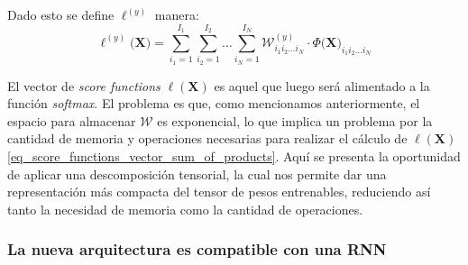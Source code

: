 \documentclass[spanish]{article}
\theoremstyle{definition}
\theoremstyle{remark}
\numberwithin{equation}{section}
\numberwithin{equation}{section} %
\begin{document}
Dado esto se define $\ell^{(y)}$ manera:
\begin{equation}
\label{eq_score_functions_vector_sum_of_products}
\ell^{(y)}\big(\boldsymbol{X}\big)=\sum_{i_1=1}^{I_1}\sum_{i_2=1}^{I_2}\dots\sum_{i_N=1}^{I_N} \mathcal{W}^{(y)}_{i_1i_2\ldots i_N} \cdot \mathit{\Phi}\Big(\boldsymbol{X}\Big)_{i_1i_2\ldots i_N} 
\end{equation}\par
\par
El vector de \textit{score functions} $\ell(\boldsymbol{X})$ es aquel que luego será alimentado a la función \textit{softmax}. El problema es que, como mencionamos anteriormente, el espacio para almacenar $\mathcal{W}$ es exponencial, lo que implica un problema por la cantidad de memoria y operaciones necesarias para realizar el cálculo de $\ell(\boldsymbol{X})$ \eqref{eq_score_functions_vector_sum_of_products}. Aquí se presenta la oportunidad de aplicar una descomposición tensorial, la cual nos permite dar una representación más compacta del tensor de pesos entrenables, reduciendo así tanto la necesidad de memoria como la cantidad de operaciones. 

\subsubsection{La nueva arquitectura es compatible con una RNN}
\end{document}

